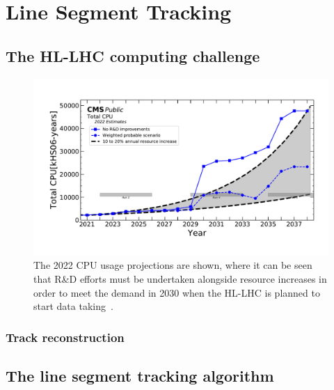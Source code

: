 \chapter{Line Segment Tracking}\label{ch:lst}

\section{The HL-LHC computing challenge}

\begin{figure}[htb]
    \centering
    \includegraphics[width=.9\textwidth]{fig/lst/cpu_cms2022.pdf}
    \caption{
        The 2022 CPU usage projections are shown, where it can be seen that R\&D efforts must be undertaken alongside resource increases in order to meet the demand in 2030 when the HL-LHC is planned to start data taking~\cite{CMSComputingReport2022}.
    }
    \label{fig:cpu_projections}
\end{figure}

\subsection{Track reconstruction}

\section{The line segment tracking algorithm}

